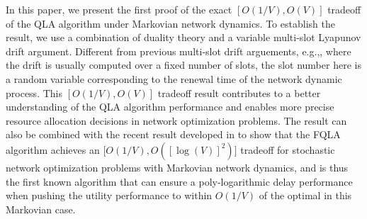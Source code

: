 \documentclass[journal]{IEEEtran}
\begin{document}
In this paper, we present the first proof of the exact $[O(1/V), O(V)]$ tradeoff of the QLA algorithm under Markovian network dynamics. To establish the result, we use a combination of duality theory and a variable multi-slot Lyapunov drift argument. Different from previous multi-slot drift arguements, e.g.,\cite{neelynowbook}, where the drift is usually computed over a fixed number of slots, the slot number here is a random variable corresponding to the renewal time of the network dynamic process. 
This $[O(1/V), O(V)]$ tradeoff result contributes to a better understanding of the QLA algorithm performance and enables more precise resource allocation  decisions in network optimization problems. The result can also be combined with the recent result developed in \cite{huangneely_dr_wiopt09} to show that the FQLA algorithm achieves an $\big[O(1/V), O([\log(V)]^2)\big]$ tradeoff for stochastic network optimization problems with Markovian network dynamics, and is thus the  first known algorithm that can ensure a poly-logarithmic delay performance when pushing the utility performance to within $O(1/V)$ of the optimal in this Markovian case. %

%

\end{document}
